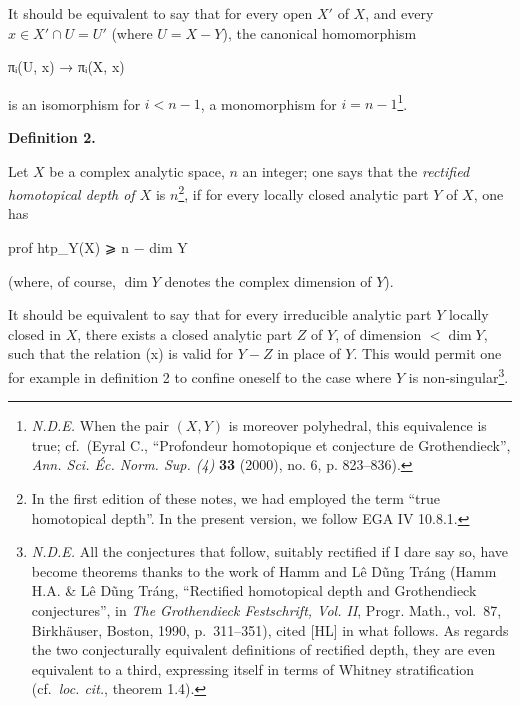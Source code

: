 \documentclass[
]{article}
\newenvironment{Shaded}{}{}
\newcommand{\NormalTok}[1]{#1}
\begin{document}
It should be equivalent to say that for every open \(X'\) of \(X\), and
every \(x \in X' \cap U = U'\) (where \(U = X - Y\)), the canonical
homomorphism

\begin{Shaded}
\begin{Highlighting}[]
\NormalTok{πᵢ(U\textquotesingle{}, x) → πᵢ(X\textquotesingle{}, x)}
\end{Highlighting}
\end{Shaded}

is an isomorphism for \(i < n - 1\), a monomorphism for
\(i = n - 1\)\footnote{\emph{N.D.E.} When the pair \((X, Y)\) is
  moreover polyhedral, this equivalence is true; cf.~(Eyral C.,
  ``Profondeur homotopique et conjecture de Grothendieck'', \emph{Ann.
  Sci. Éc. Norm. Sup. (4)} \textbf{33} (2000), no. 6, p. 823--836).}.

\textbf{Definition 2.}

Let \(X\) be a complex analytic space, \(n\) an integer; one says that
the \emph{rectified homotopical depth of \(X\)} is \(n\)\footnote{In the
  first edition of these notes, we had employed the term ``true
  homotopical depth''. In the present version, we follow EGA IV 10.8.1.},
if for every locally closed analytic part \(Y\) of \(X\), one has

\begin{Shaded}
\begin{Highlighting}[]
\NormalTok{prof htp\_Y(X) ⩾ n − dim Y}
\end{Highlighting}
\end{Shaded}

(where, of course, \(\dim Y\) denotes the complex dimension of \(Y\)).

It should be equivalent to say that for every irreducible analytic part
\(Y\) locally closed in \(X\), there exists a closed analytic part \(Z\)
of \(Y\), of dimension \(< \dim Y\), such that the relation (x) is valid
for \(Y - Z\) in place of \(Y\). This would permit one for example in
definition 2 to confine oneself to the case where \(Y\) is
non-singular\footnote{\emph{N.D.E.} All the conjectures that follow,
  suitably rectified if I dare say so, have become theorems thanks to
  the work of Hamm and Lê Dũng Tráng (Hamm H.A. \& Lê Dũng Tráng,
  ``Rectified homotopical depth and Grothendieck conjectures'', in
  \emph{The Grothendieck Festschrift, Vol. II}, Progr. Math., vol.~87,
  Birkhäuser, Boston, 1990, p.~311--351), cited {[}HL{]} in what
  follows. As regards the two conjecturally equivalent definitions of
  rectified depth, they are even equivalent to a third, expressing
  itself in terms of Whitney stratification (cf.~\emph{loc. cit.},
  theorem 1.4).}.
\end{document}
